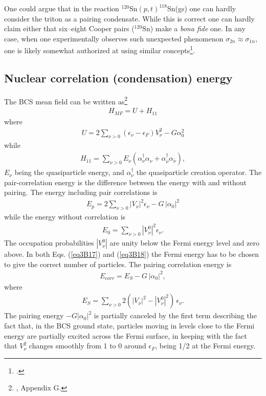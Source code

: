 \begin{subappendices}
One could argue that in the reaction $^{120}$Sn$(p,t)^{118}$Sn(gs) one can hardly consider the triton as a pairing condensate. While this is correct one can hardly claim either that six--eight Cooper pairs ($^{120}$Sn) make a \textit{bona fide} one. In any case, when one experimentally observes such unexpected phenomenon $\sigma_{2n}\approx\sigma_{1n}$, one is likely somewhat authorized at using similar concepts\footnote{\cite{Anderson:72}.}.
\subsection{Nuclear correlation (condensation) energy}\label{App3B4}
The BCS mean field can be written as\footnote{\cite{Brink:05}, Appendix G.}
 \begin{align}\label{eq3B14}
H_{MF}=U+H_{11}
 \end{align} 
where
 \begin{align}\label{eq3B15}
 U=2\sum_{\nu>0}(\epsilon_\nu-\epsilon_F)V_\nu^2-G\alpha_0^2
 \end{align} 
while
 \begin{align}\label{eq3B16}
H_{11}=\sum_{\nu>0}E_\nu(\alpha_\nu^\dagger\alpha_\nu+\alpha_{\bar\nu}^\dagger\alpha_{\bar\nu}),
 \end{align} 
$E_\nu$ being the quasiparticle energy, and $\alpha^\dagger_\nu$ the quasiparticle creation operator. The pair-correlation energy is the difference between the energy with and without pairing. The energy including pair correlations is
 \begin{align}\label{eq3B17}
E_p=2\sum_{\nu>0}|V_\nu|^2\epsilon_\nu-G\,|\alpha_0|^2
 \end{align} 
 while the energy without correlation is
  \begin{align}\label{eq3B18}
  E_0=\sum_{\nu>0}|V^0_\nu|^2\epsilon_\nu.
  \end{align} 
 The occupation probabilities $|V^0_\nu|$ are unity below the Fermi energy level and zero above. In both Eqs. (\ref{eq3B17}) and (\ref{eq3B18}) the Fermi energy has to be chosen to give the correct number of particles. The pairing correlation energy is 
   \begin{align}\label{eq3B19}
E_{corr}=E_S-G\,|\alpha_0|^2,
   \end{align} 
 where
   \begin{align}\label{eq3B20}
E_S=\sum_{\nu>0}2(|V_\nu|^2-|V^0_\nu|^2)\,\epsilon_\nu.
   \end{align}  
 The  pairing energy $-G|\alpha_0|^2$ is partially canceled by the first term describing the fact that, in the BCS ground state, particles moving in levels close to the Fermi energy are partially excited across the Fermi surface, in keeping with the fact that $V_\nu^2$ changes smoothly from 1 to 0 around $\epsilon_F$, being 1/2 at the Fermi energy.
 

\end{subappendices}
